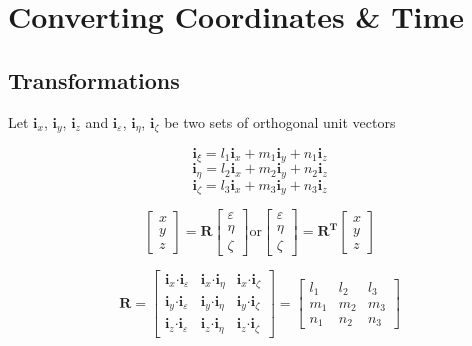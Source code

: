 %
\chapter{Converting Coordinates \& Time}
\section{Transformations}

Let $\mathbf{i}_{x}$, $\mathbf{i}_{y}$, $\mathbf{i}_{z}$ and $\mathbf{i}_{\varepsilon}$, $\mathbf{i}_{\eta}$, $\mathbf{i}_{\zeta}$ be two sets of orthogonal unit vectors

\[\mathbf{i}_{\xi}=l_{1}\mathbf{i}_{x}+m_{1}\mathbf{i}_{y}+n_{1}\mathbf{i}_{z}\]
\[\mathbf{i}_{\eta}=l_{2}\mathbf{i}_{x}+m_{2}\mathbf{i}_{y}+n_{2}\mathbf{i}_{z}\]
\[\mathbf{i}_{\zeta}=l_{3}\mathbf{i}_{x}+m_{3}\mathbf{i}_{y}+n_{3}\mathbf{i}_{z}\]

\[ \left[ \begin{array}{c} x \\ y \\ z  \end{array} \right] = \mathbf{R}\left[ \begin{array}{c} \varepsilon \\ \eta \\ \zeta  \end{array} \right] \mbox{or}
\left[ \begin{array}{c} \varepsilon \\ \eta \\ \zeta  \end{array} \right] = \mathbf{R^{T}}\left[ \begin{array}{c} x \\ y \\ z  \end{array} \right] \]

\[\mathbf{R}=\left[ \begin{array}{ccc}
\mathbf{i}_{x}\mathbf{\cdot}\mathbf{i}_{\varepsilon} & \mathbf{i}_{x}\mathbf{\cdot}\mathbf{i}_{\eta} & \mathbf{i}_{x}\mathbf{\cdot}\mathbf{i}_{\zeta} \\
\mathbf{i}_{y}\mathbf{\cdot}\mathbf{i}_{\varepsilon} & \mathbf{i}_{y}\mathbf{\cdot}\mathbf{i}_{\eta} & \mathbf{i}_{y}\mathbf{\cdot}\mathbf{i}_{\zeta} \\
\mathbf{i}_{z}\mathbf{\cdot}\mathbf{i}_{\varepsilon} & \mathbf{i}_{z}\mathbf{\cdot}\mathbf{i}_{\eta} & \mathbf{i}_{z}\mathbf{\cdot}\mathbf{i}_{\zeta}
\end{array} \right] = \left[ \begin{array}{ccc}
l_{1} & l_{2} & l_{3} \\
m_{1} & m_{2} & m_{3} \\
n_{1} & n_{2} & n_{3}
\end{array} \right] \]

